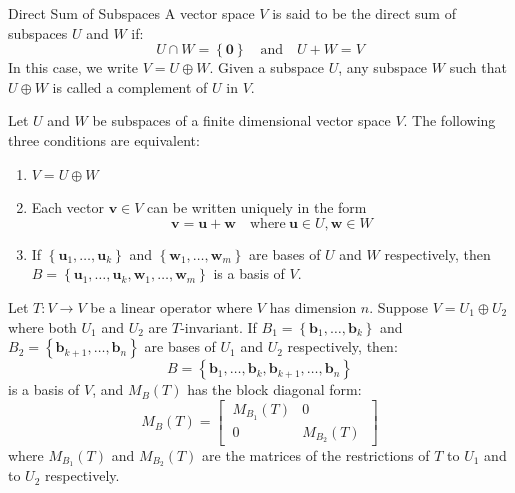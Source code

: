 \documentclass[12pt]{article}
\begin{document}
\begin{definition}{Direct Sum of Subspaces}{}
    A vector space $ V $ is said to be the direct sum of subspaces $ U $ and $ W $ if:
    \[ U \cap W = \left\{ \mathbf{0} \right\} \quad \text{and} \quad U + W = V \]
    In this case, we write $ V = U \oplus W $. Given a subspace $ U $, any subspace $ W $ such that $ U \oplus W $ is called a complement of $ U $ in $ V $.
\end{definition}

\begin{theorem}{}{}
    Let $ U $ and $ W $ be subspaces of a finite dimensional vector space $ V $. The following three conditions are equivalent:
    \begin{enumerate}[label=(\roman*)]
        \item $ V = U \oplus W $
        \item Each vector $ \mathbf{v} \in V $ can be written uniquely in the form
        \[ \mathbf{v} = \mathbf{u} + \mathbf{w} \quad \text{where} \ \mathbf{u} \in U, \mathbf{w} \in W \]
        \item If $ \left\{ \mathbf{u}_1, \dots, \mathbf{u}_k \right\} $ and $ \left\{ \mathbf{w}_1, \dots, \mathbf{w}_m \right\} $ are bases of $ U $ and $ W $ respectively, then $ B = \left\{ \mathbf{u}_1, \dots, \mathbf{u}_k, \mathbf{w}_1, \dots, \mathbf{w}_m \right\} $ is a basis of $ V $.
    \end{enumerate}
\end{theorem}

\begin{theorem}{}{}
    Let $ T : V \to V $ be a linear operator where $ V $ has dimension $ n $. Suppose $ V = U_1 \oplus U_2 $ where both $ U_1 $ and $ U_2 $ are $ T $-invariant. If $ B_1 = \left\{ \mathbf{b}_1, \dots, \mathbf{b}_k \right\} $ and $ B_2 = \left\{ \mathbf{b}_{k+1}, \dots, \mathbf{b}_n \right\} $ are  bases of $ U_1 $ and $ U_2 $ respectively, then:
    \[ B = \left\{ \mathbf{b}_1, \dots, \mathbf{b}_k, \mathbf{b}_{k+1}, \dots, \mathbf{b}_n \right\} \]
    is a basis of $ V $, and $ M_B \left( T \right) $ has the block diagonal form:
    \[ M_B \left( T \right) = \begin{bmatrix} \ M_{B_1} \left( T \right) & 0 \ \\ \ 0 & M_{B_2} \left( T \right) \ \end{bmatrix} \]
    where $ M_{B_1} \left( T \right) $ and $ M_{B_2} \left( T \right) $ are the matrices of the restrictions of $ T $ to $ U_1 $ and to $ U_2 $ respectively.
\end{theorem}
\end{document}

